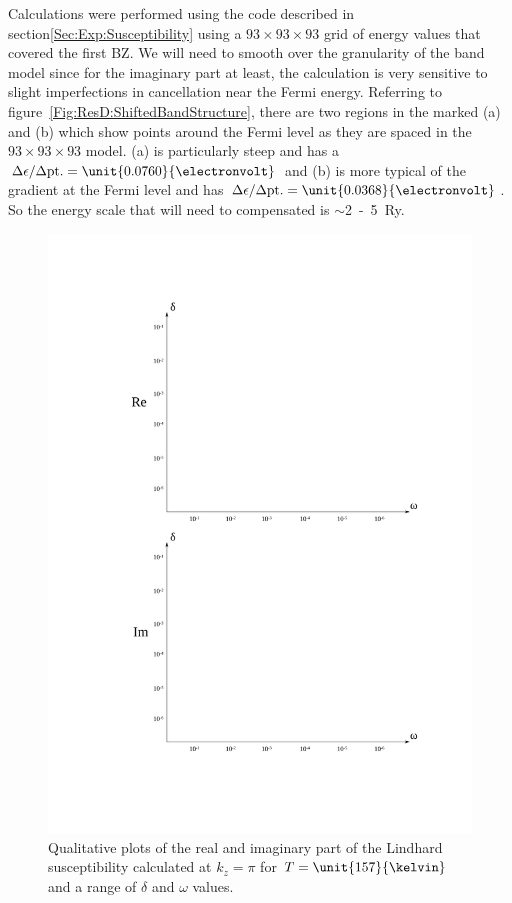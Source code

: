 Calculations were performed using the  code described in section\ref{Sec:Exp:Susceptibility} using a $93\times93\times93$ grid of energy values that covered the first \ac{BZ}. We will need to smooth over the granularity of the \WIEN band model since for the imaginary part at least, the calculation is very sensitive to slight imperfections in cancellation near the Fermi energy. Referring to figure~\ref{Fig:ResD:ShiftedBandStructure}, there are two regions in the marked (a) and (b) which show points around the Fermi level as they are spaced in the $93\times93\times93$ model. (a) is particularly steep and has a $\Delta \epsilon/\Delta\textrm{pt.} = \unit{0.0760}{\electronvolt}$ and (b) is more typical of the gradient at the Fermi level and has $\Delta \epsilon/\Delta\textrm{pt.} = \unit{0.0368}{\electronvolt}$. So the energy scale that will need to compensated is $\sim$\unit{2-5}{Ry}.

\begin{figure}[htbp]
    \begin{center}
        \includegraphics[scale=0.9]{Chapter-dHvABaFe2P2/Figures/Susceptibility/RangeDeltaOmega/RangeDeltaOmega}
        \caption{Qualitative plots of the real and imaginary part of the Lindhard susceptibility calculated at $k_z=\pi$ for $T=\unit{157}{\kelvin}$ and a range of $\delta$ and $\omega$ values.}
        \label{Fig:ResD:RangeDeltaOmega}
    \end{center}
\end{figure}

